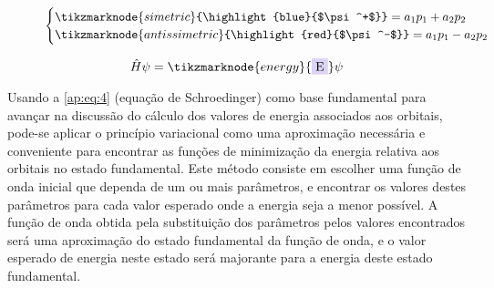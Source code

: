 \begin{figure}[htb]
    \vspace{2\baselineskip}
\begin{equation}
    \label{ap:eq:3}
    \begin{cases}
\tikzmarknode{simetric}{\highlight{blue}{$\psi^+$}} = a_1 p_1 + a_2 p_2 \\
\tikzmarknode{antissimetric}{\highlight{red}{$\psi^-$}} = a_1 p_1 - a_2 p_2
    \end{cases}
\end{equation}
\end{figure}

\begin{figure}[htb]
    \vspace{2\baselineskip}
\begin{equation}
\label{ap:eq:4}
    \hat{H} \psi = \tikzmarknode{energy}{\highlight{blue}{E}} \psi
\end{equation}
\end{figure}

Usando a \autoref{ap:eq:4} (equação de Schroedinger) como base fundamental para avançar na discussão do cálculo dos valores de energia associados aos orbitais, pode-se aplicar o princípio variacional como uma aproximação necessária e conveniente para encontrar as funções de minimização da energia relativa aos orbitais no estado fundamental. Este método consiste em escolher uma função de onda inicial que dependa de um ou mais parâmetros, e encontrar os valores destes parâmetros para cada valor esperado onde a energia seja a menor possível. A função de onda obtida pela substituição dos parâmetros pelos valores encontrados será uma aproximação do estado fundamental da função de onda, e o valor esperado de energia neste estado será majorante para a energia deste estado fundamental.

